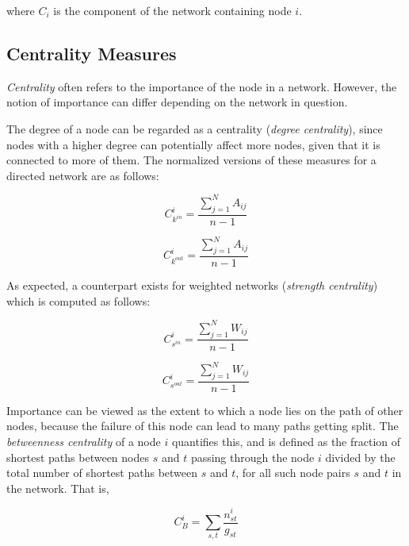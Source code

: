 \documentclass[12pt,letterpaper]{report}
\begin{document}
\noindent where $C_i$ is the component of the network containing node $i$. 
	
\subsection{Centrality Measures}
\label{ssec:312Centrality}

	\textit{Centrality} often refers to the importance of the node in a network. However, the notion of importance can differ depending on the network in question. 
	
	The degree of a node can be regarded as a centrality (\textit{degree centrality}), since nodes with a higher degree can potentially affect more nodes, given that it is connected to more of them. The normalized versions of these measures for a directed network are as follows:
	
	\begin{equation}
	\label{eqn:308Ckin} C_{k^{in}}^{i} = \frac{\sum_{j=1}^N A_{ij}}{n - 1}
	\end{equation}
	
	\begin{equation}
	\label{eqn:309Ckout} C_{k^{out}}^{i} = \frac{\sum_{j=1}^N A_{ij}}{n - 1}
	\end{equation}
	
	As expected, a counterpart exists for weighted networks (\textit{strength centrality}) which is computed as follows:

	\begin{equation}
	\label{eqn:310Csin} C_{s^{in}}^{i} = \frac{\sum_{j=1}^N W_{ij}}{n - 1}
	\end{equation}
	
	\begin{equation}
	\label{eqn:311Csout} C_{s^{out}}^{i} = \frac{\sum_{j=1}^N W_{ij}}{n - 1}
	\end{equation}
	
	Importance can be viewed as the extent to which a node lies on the path of other nodes, because the failure of this node can lead to many paths getting split. The \textit{betweenness centrality} of a node $i$ quantifies this, and is defined as the fraction of shortest paths between nodes $s$ and $t$ passing through the node $i$ divided by the total number of shortest paths between $s$ and $t$, for all such node pairs $s$ and $t$ in the network. That is,
	 
	\begin{equation}
	\label{eqn:312Cb} C_{B}^{i} = \sum_{s, t} \frac{n^{i}_{st}}{g_{st}}
	\end{equation}
\end{document}
